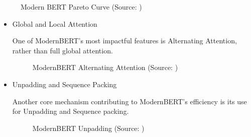 \documentclass[letterpaper,11pt,english]{sphinxmanual}
\begin{document}
\begin{figure}[htbp]
\centering
\capstart

\noindent{}
\caption{Modern BERT Pareto Curve (Source: )}\label{\detokenize{prelim:id4}}\label{\detokenize{prelim:fig-mbert-curve}}\end{figure}
\begin{itemize}
\item {} 
\sphinxAtStartPar
Global and Local Attention

\sphinxAtStartPar
One of ModernBERT’s most impactful features is Alternating Attention, rather than full global attention.

\begin{figure}[htbp]
\centering
\capstart

\noindent{}
\caption{ModernBERT Alternating Attention (Source: )}\label{\detokenize{prelim:id5}}\label{\detokenize{prelim:fig-mbert-attention}}\end{figure}

\item {} 
\sphinxAtStartPar
Unpadding and Sequence Packing

\sphinxAtStartPar
Another core mechanism contributing to ModernBERT’s efficiency is its use for Unpadding and Sequence packing.

\begin{figure}[htbp]
\centering
\capstart

\noindent{}
\caption{ModernBERT Unpadding (Source: )}\label{\detokenize{prelim:id6}}\label{\detokenize{prelim:fig-mbert-unpadding}}\end{figure}

\end{itemize}
\end{document}

